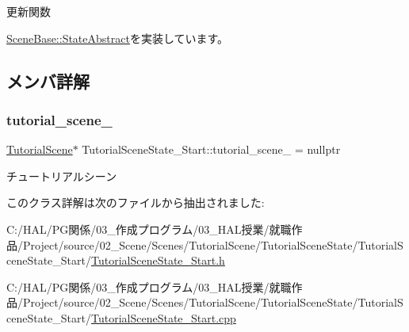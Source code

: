 更新関数 



\mbox{\hyperlink{class_scene_base_1_1_state_abstract_a7fca4c5e7d0174af8a147c404f4e6eee}{Scene\+Base\+::\+State\+Abstract}}を実装しています。



\subsection{メンバ詳解}
\mbox{\label{class_tutorial_scene_state___start_a1fea5f4f4713a1461a86cbc9fc263e41}} 
\subsubsection{\texorpdfstring{tutorial\+\_\+scene\+\_\+}{tutorial\_scene\_}}
{\footnotesize\ttfamily \mbox{\hyperlink{class_tutorial_scene}{Tutorial\+Scene}}$\ast$ Tutorial\+Scene\+State\+\_\+\+Start\+::tutorial\+\_\+scene\+\_\+ = nullptr\hspace{0.3cm}{\ttfamily [protected]}}



チュートリアルシーン 



このクラス詳解は次のファイルから抽出されました\+:\begin{DoxyCompactItemize}
\item 
C\+:/\+H\+A\+L/\+P\+G関係/03\+\_\+作成プログラム/03\+\_\+\+H\+A\+L授業/就職作品/\+Project/source/02\+\_\+\+Scene/\+Scenes/\+Tutorial\+Scene/\+Tutorial\+Scene\+State/\+Tutorial\+Scene\+State\+\_\+\+Start/\mbox{\hyperlink{_tutorial_scene_state___start_8h}{Tutorial\+Scene\+State\+\_\+\+Start.\+h}}\item 
C\+:/\+H\+A\+L/\+P\+G関係/03\+\_\+作成プログラム/03\+\_\+\+H\+A\+L授業/就職作品/\+Project/source/02\+\_\+\+Scene/\+Scenes/\+Tutorial\+Scene/\+Tutorial\+Scene\+State/\+Tutorial\+Scene\+State\+\_\+\+Start/\mbox{\hyperlink{_tutorial_scene_state___start_8cpp}{Tutorial\+Scene\+State\+\_\+\+Start.\+cpp}}\end{DoxyCompactItemize}
